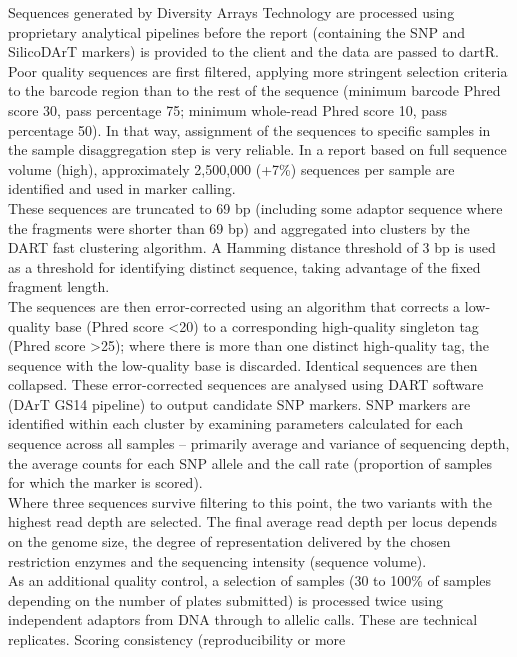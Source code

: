 \documentclass[
  letterpaper,
  DIV=11,
  numbers=noendperiod]{scrreprt}
\begin{document}
Sequences generated by Diversity Arrays Technology are processed using
proprietary analytical pipelines before the report (containing the SNP
and SilicoDArT markers) is provided to the client and the data are
passed to dartR.\\
Poor quality sequences are first filtered, applying more stringent
selection criteria to the barcode region than to the rest of the
sequence (minimum barcode Phred score 30, pass percentage 75; minimum
whole-read Phred score 10, pass percentage 50). In that way, assignment
of the sequences to specific samples in the sample disaggregation step
is very reliable. In a report based on full sequence volume (high),
approximately 2,500,000 (+7\%) sequences per sample are identified and
used in marker calling.\\
These sequences are truncated to 69 bp (including some adaptor sequence
where the fragments were shorter than 69 bp) and aggregated into
clusters by the DART fast clustering algorithm. A Hamming distance
threshold of 3 bp is used as a threshold for identifying distinct
sequence, taking advantage of the fixed fragment length.\\
The sequences are then error-corrected using an algorithm that corrects
a low-quality base (Phred score \textless20) to a corresponding
high-quality singleton tag (Phred score \textgreater25); where there is
more than one distinct high-quality tag, the sequence with the
low-quality base is discarded. Identical sequences are then collapsed.
These error-corrected sequences are analysed using DART software (DArT
GS14 pipeline) to output candidate SNP markers. SNP markers are
identified within each cluster by examining parameters calculated for
each sequence across all samples -- primarily average and variance of
sequencing depth, the average counts for each SNP allele and the call
rate (proportion of samples for which the marker is scored).\\
Where three sequences survive filtering to this point, the two variants
with the highest read depth are selected. The final average read depth
per locus depends on the genome size, the degree of representation
delivered by the chosen restriction enzymes and the sequencing intensity
(sequence volume).\\
As an additional quality control, a selection of samples (30 to 100\% of
samples depending on the number of plates submitted) is processed twice
using independent adaptors from DNA through to allelic calls. These are
technical replicates. Scoring consistency (reproducibility or more
\end{document}

